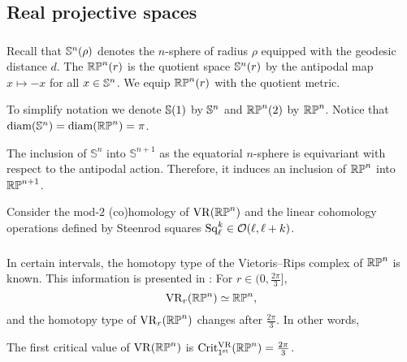 
\subsection{Real projective spaces} \label{sub:first_critical_value_rpn}

\subsubsection{}

Recall that $\mathbb{S}^n(\rho)$ denotes the $n$-sphere of radius $\rho$ equipped with the geodesic distance $d$.
The  $\mathbb{RP}^n(r)$ is the quotient space $\mathbb{S}^n(r)$ by the antipodal map $x \mapsto -x$ for all $x \in \mathbb{S}^n$.
We equip $\mathbb{RP}^n(r)$ with the quotient metric.

To simplify notation we denote $\mathbb{S}(1)$ by $\mathbb{S}^n$ and $\mathbb{RP}^n(2)$ by $\mathbb{RP}^n$.
Notice that $\operatorname{diam}(\mathbb{S}^n) = \operatorname{diam}(\mathbb{RP}^n) = \pi$.

The inclusion of \(\mathbb{S}^n\) into \(\mathbb{S}^{n+1}\) as the equatorial $n$-sphere is equivariant with respect to the antipodal action.
Therefore, it induces an inclusion of \(\mathbb{RP}^n\) into \(\mathbb{RP}^{n+1}\).


Consider the mod-\(2\) (co)homology of \(\mathrm{VR}(\mathbb{RP}^n)\) and the linear cohomology operations defined by Steenrod squares \(\operatorname{Sq}^k_\ell \in \mathcal{O}(\ell,\ell+k)\).

\subsubsection{}
\label{subsub:rpn homotopy type}

In certain intervals, the homotopy type of the Vietoris--Rips complex of $\mathbb{RP}^n$ is known.
This information is presented in \cite[Thm.~4.5]{adams2022metric}:
For $r \in (0,\frac{2\pi}{3} ]$,
\[
\mathrm{VR}_r(\mathbb{RP}^n) \simeq \mathbb{RP}^n,
\]
and the homotopy type of $\mathrm{VR}_r(\mathbb{RP}^n)$ changes after $\tfrac{2\pi}{3}$.
In other words,

\medskip\proposition
The first critical value of \(\mathrm{VR}(\mathbb{RP}^n)\) is \(\operatorname{Crit^{\mathrm{VR}}_{1^{\mathrm{st}}}}(\mathbb{RP}^n) = \frac{2\pi}{3}\).

